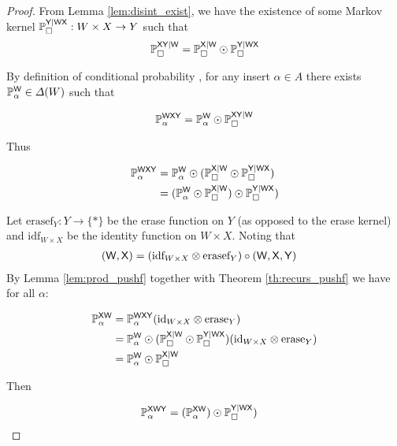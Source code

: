\begin{proof}
From Lemma \ref{lem:disint_exist}, we have the existence of some Markov kernel $\mathbb{P}_\square^{\mathsf{Y}|\mathsf{WX}}:W\times X\to Y$ such that
\begin{align}
	\mathbb{P}_\square^{\mathsf{XY}|\mathsf{W}}=\mathbb{P}_\square^{\mathsf{X}|\mathsf{W}}\odot \mathbb{P}_\square^{\mathsf{Y}|\mathsf{WX}}\label{eq:k_disint}
\end{align}

By definition of conditional probability , for any insert $\alpha\in A$ there exists $\mathbb{P}_\alpha^{\mathsf{W}}\in\Delta(W)$ such that

\begin{align}
	\mathbb{P}_\alpha^{\mathsf{WXY}}=\mathbb{P}_\alpha^{\mathsf{W}}\odot\mathbb{P}_\square^{\mathsf{XY}|\mathsf{W}}
\end{align}

Thus

\begin{align}
\mathbb{P}_\alpha^{\mathsf{WXY}}&= \mathbb{P}_\alpha^{\mathsf{W}}\odot(\mathbb{P}_\square^{\mathsf{X}|\mathsf{W}}\odot \mathbb{P}_\square^{\mathsf{Y}|\mathsf{WX}})\\
&= (\mathbb{P}_\alpha^{\mathsf{W}}\odot\mathbb{P}_\square^{\mathsf{X}|\mathsf{W}})\odot \mathbb{P}_\square^{\mathsf{Y}|\mathsf{WX}})
\end{align}

Let $\text{erasef}_Y:Y\to \{*\}$ be the erase function on $Y$ (as opposed to the erase kernel) and $\text{idf}_{W\times X}$ be the identity function on $W\times X$. Noting that 
\begin{align}
(\mathsf{W},\mathsf{X})&=(\text{idf}_{W\times X}\otimes \text{erasef}_Y)\circ (\mathsf{W},\mathsf{X},\mathsf{Y})
\end{align}
By Lemma \ref{lem:prod_pushf} together with Theorem \ref{th:recurs_pushf} we have for all $\alpha$:

\begin{align}
	\mathbb{P}_\alpha^{\mathsf{XW}} &= \mathbb{P}_\alpha^{\mathsf{WXY}}(\text{id}_{W\times X}\otimes \text{erase}_Y)\\
							  &= \mathbb{P}_\alpha^{\mathsf{W}}\odot(\mathbb{P}_\square^{\mathsf{X}|\mathsf{W}}\odot \mathbb{P}_\square^{\mathsf{Y}|\mathsf{WX}})(\text{id}_{W\times X}\otimes \text{erase}_Y)\\
							  &= \mathbb{P}_\alpha^{\mathsf{W}}\odot\mathbb{P}_\square^{\mathsf{X}|\mathsf{W}}
\end{align}

Then

\begin{align}
\mathbb{P}_\alpha^{\mathsf{XWY}}&= (\mathbb{P}_\alpha^{\mathsf{XW}})\odot \mathbb{P}_\square^{\mathsf{Y}|\mathsf{WX}})
\end{align}


\end{proof}
